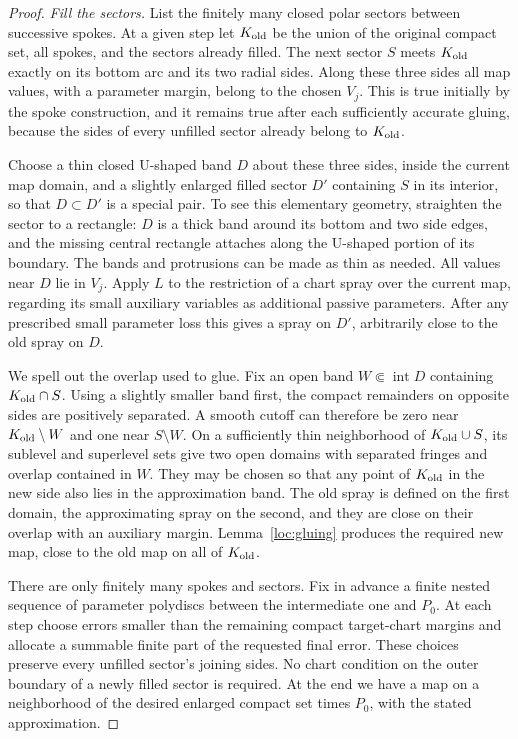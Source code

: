 \begin{proof}
\emph{Fill the sectors.}
List the finitely many closed polar sectors between successive
spokes. At a given step let $K_{\rm old}$ be the union of the
original compact set, all spokes, and the sectors already filled.
The next sector $S$ meets $K_{\rm old}$ exactly on its bottom
arc and its two radial sides. Along these three sides all map
values, with a parameter margin, belong to the chosen $V_j$.
This is true initially by the spoke construction, and it remains
true after each sufficiently accurate gluing, because the sides
of every unfilled sector already belong to $K_{\rm old}$.

Choose a thin closed U-shaped band $D$ about these three sides,
inside the current map domain, and a slightly enlarged filled
sector $D'$ containing $S$ in its interior, so that $D\subset D'$
is a special pair. To see this elementary geometry, straighten
the sector to a rectangle: $D$ is a thick band around its bottom
and two side edges, and the missing central rectangle attaches
along the U-shaped portion of its boundary. The bands and
protrusions can be made as thin as needed.
All values near $D$ lie in $V_j$. Apply $L$ to the restriction
of a chart spray over the current map, regarding its small
auxiliary variables as additional passive parameters. After any
prescribed small parameter loss this gives a spray on $D'$,
arbitrarily close to the old spray on $D$.

We spell out the overlap used to glue. Fix an open band
$W\Subset\operatorname{int}D$ containing $K_{\rm old}\cap S$.
Using a slightly smaller band first, the compact remainders on
opposite sides are positively separated. A smooth cutoff can
therefore be zero near $K_{\rm old}\setminus W$ and one near
$S\setminus W$. On a sufficiently thin neighborhood of
$K_{\rm old}\cup S$, its sublevel and superlevel sets give two
open domains with separated fringes and overlap contained in $W$.
They may be chosen so that any point of $K_{\rm old}$ in the new
side also lies in the approximation band. The old spray is
defined on the first domain, the approximating spray on the
second, and they are close on their overlap with an auxiliary
margin. Lemma~\ref{loc:gluing} produces the required new map,
close to the old map on all of $K_{\rm old}$.

There are only finitely many spokes and sectors. Fix in advance
a finite nested sequence of parameter polydiscs between the
intermediate one and $P_0$. At each step choose errors smaller
than the remaining compact target-chart margins and allocate a
summable finite part of the requested final error. These choices
preserve every unfilled sector's joining sides. No chart condition
on the outer boundary of a newly filled sector is required.
At the end we have a map on a neighborhood of the desired
enlarged compact set times $P_0$, with the stated approximation.
\end{proof}

